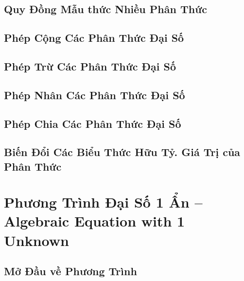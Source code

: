 \documentclass{article}
\numberwithin{equation}{section}
\begin{document}
\subsection{Quy Đồng Mẫu thức Nhiều Phân Thức}


\subsection{Phép Cộng Các Phân Thức Đại Số}


\subsection{Phép Trừ Các Phân Thức Đại Số}


\subsection{Phép Nhân Các Phân Thức Đại Số}


\subsection{Phép Chia Các Phân Thức Đại Số}


\subsection{Biến Đổi Các Biểu Thức Hữu Tỷ. Giá Trị của Phân Thức}


\section{Phương Trình Đại Số 1 Ẩn -- Algebraic Equation with 1 Unknown}

\subsection{Mở Đầu về Phương Trình}
\end{document}
